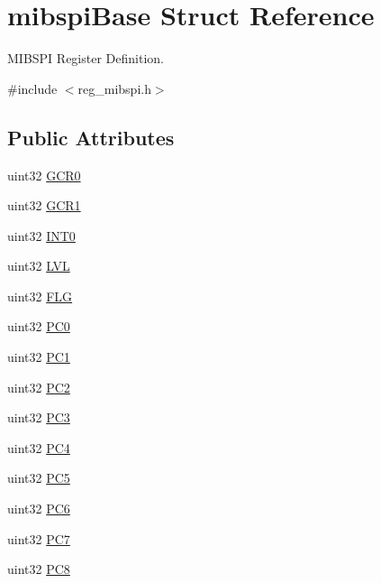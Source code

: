 \hypertarget{structmibspiBase}{}\section{mibspi\+Base Struct Reference}
\label{structmibspiBase}


M\+I\+B\+S\+PI Register Definition.  




{\ttfamily \#include $<$reg\+\_\+mibspi.\+h$>$}

\subsection*{Public Attributes}
\begin{DoxyCompactItemize}
\item 
uint32 \mbox{\hyperlink{structmibspiBase_ac2a1e37e9c00c55fab5f6781ccfec27d}{G\+C\+R0}}
\item 
uint32 \mbox{\hyperlink{structmibspiBase_ad690d4545fd4bdcb646de04d360f3157}{G\+C\+R1}}
\item 
uint32 \mbox{\hyperlink{structmibspiBase_a0c8e26d4d1a34fde7839c1fe30b9f1f6}{I\+N\+T0}}
\item 
uint32 \mbox{\hyperlink{structmibspiBase_a6aaec8fbcb76945dde833ca6482fadc2}{L\+VL}}
\item 
uint32 \mbox{\hyperlink{structmibspiBase_a2c373c8dbe9cb23d171703789a7d9500}{F\+LG}}
\item 
uint32 \mbox{\hyperlink{structmibspiBase_a9b97fd409665ce9822fcd2a47e6735de}{P\+C0}}
\item 
uint32 \mbox{\hyperlink{structmibspiBase_ac6e28f7a6924f52cf294a11ca4047bed}{P\+C1}}
\item 
uint32 \mbox{\hyperlink{structmibspiBase_a20c0e9faa6917832f56e6867becacf52}{P\+C2}}
\item 
uint32 \mbox{\hyperlink{structmibspiBase_a2aeece31333b3495193f6f7b788fea5c}{P\+C3}}
\item 
uint32 \mbox{\hyperlink{structmibspiBase_a9da5db31af2ba200c4b7933571b79379}{P\+C4}}
\item 
uint32 \mbox{\hyperlink{structmibspiBase_a24a90e671736eb1a7053f4d10b4fbda6}{P\+C5}}
\item 
uint32 \mbox{\hyperlink{structmibspiBase_a3a433344e81efd566c9bbad9e7e5aa5c}{P\+C6}}
\item 
uint32 \mbox{\hyperlink{structmibspiBase_ad6774736af035f04f4765fc571dec311}{P\+C7}}
\item 
uint32 \mbox{\hyperlink{structmibspiBase_ac5c9737d8d33dd35c18ca969fbc9c086}{P\+C8}}

\end{DoxyCompactItemize}
